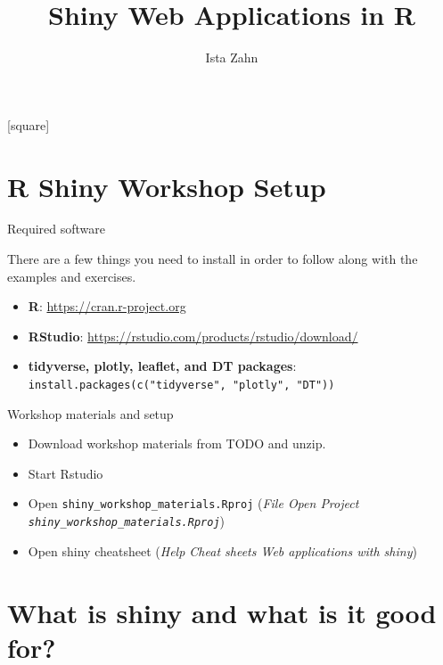 \documentclass[
  12pt,
  ignorenonframetext,
]{beamer}
\title{Shiny Web Applications in R}
\author{Ista Zahn}
\date{}
\providecommand{\tightlist}{%
  \setlength{\itemsep}{0pt}\setlength{\parskip}{0pt}}
\begin{document}
\frame{\titlepage}

[square]

\begin{frame}
  \tableofcontents[hideallsubsections]
\end{frame}
\hypertarget{r-shiny-workshop-setup}{%
\section{R Shiny Workshop Setup}\label{r-shiny-workshop-setup}}

\begin{frame}[fragile]{Required software}
\protect\hypertarget{required-software}{}

There are a few things you need to install in order to follow along with
the examples and exercises.

\begin{itemize}
\tightlist
\item
  \textbf{R}: \url{https://cran.r-project.org}
\item
  \textbf{RStudio}: \url{https://rstudio.com/products/rstudio/download/}
\item
  \textbf{tidyverse, plotly, leaflet, and DT packages}:
  \newline \texttt{install.packages(c("tidyverse",\ "plotly",\ "DT"))}
\end{itemize}

\end{frame}

\begin{frame}[fragile]{Workshop materials and setup}
\protect\hypertarget{workshop-materials-and-setup}{}

\begin{itemize}
\tightlist
\item
  Download workshop materials from TODO and unzip.
\item
  Start Rstudio
\item
  Open \texttt{shiny\_workshop\_materials.Rproj} (\emph{File
  \rightarrow Open Project
  \rightarrow \texttt{shiny\_workshop\_materials.Rproj}})
\item
  Open shiny cheatsheet (\emph{Help \rightarrow Cheat sheets
  \rightarrow Web applications with shiny})
\end{itemize}

\end{frame}

\hypertarget{what-is-shiny-and-what-is-it-good-for}{%
\section{What is shiny and what is it good
for?}\label{what-is-shiny-and-what-is-it-good-for}}
\end{document}
